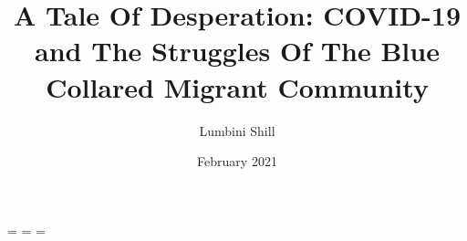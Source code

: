 \documentclass[fontsize=13bp,oneside,print]{proposal}
\title{A Tale Of Desperation: COVID-19 and The Struggles Of The Blue Collared Migrant Community}
\author{Lumbini Shill}
\date{February 2021}
\begin{document}
\newdimen\origiwspc
\newdimen\origiwstr
\origiwspc=\font %
\origiwstr=\font %
\font=\origiwstr
{}\origiwspc %



\begingroup
\mainmatter






\endgroup




\end{document}
